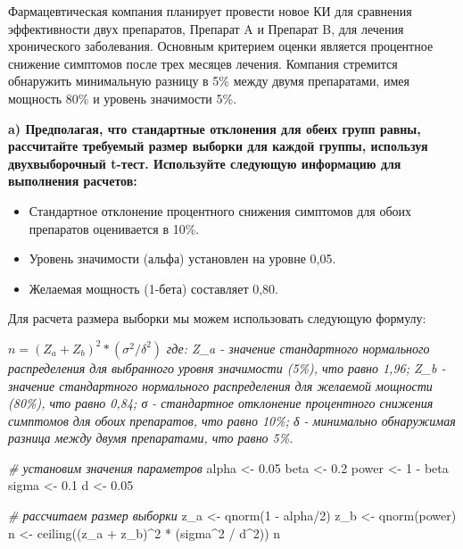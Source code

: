 \documentclass[
]{article}
\newenvironment{Shaded}{\begin{snugshade}}{\end{snugshade}}
\newcommand{\CommentTok}[1]{\textcolor[rgb]{0.56,0.35,0.01}{\textit{#1}}}
\newcommand{\DecValTok}[1]{\textcolor[rgb]{0.00,0.00,0.81}{#1}}
\newcommand{\FloatTok}[1]{\textcolor[rgb]{0.00,0.00,0.81}{#1}}
\newcommand{\FunctionTok}[1]{\textcolor[rgb]{0.00,0.00,0.00}{#1}}
\newcommand{\NormalTok}[1]{#1}
\newcommand{\OtherTok}[1]{\textcolor[rgb]{0.56,0.35,0.01}{#1}}
\newcommand{\SpecialCharTok}[1]{\textcolor[rgb]{0.00,0.00,0.00}{#1}}
\begin{document}
Фармацевтическая компания планирует провести новое КИ для сравнения
эффективности двух препаратов, Препарат A и Препарат B, для лечения
хронического заболевания. Основным критерием оценки является процентное
снижение симптомов после трех месяцев лечения. Компания стремится
обнаружить минимальную разницу в 5\% между двумя препаратами, имея
мощность 80\% и уровень значимости 5\%.

\textbf{a) Предполагая, что стандартные отклонения для обеих групп
равны, рассчитайте требуемый размер выборки для каждой группы, используя
двухвыборочный t-тест. Используйте следующую информацию для выполнения
расчетов:}

\begin{itemize}
\item
  Стандартное отклонение процентного снижения симптомов для обоих
  препаратов оценивается в 10\%.
\item
  Уровень значимости (альфа) установлен на уровне 0,05.
\item
  Желаемая мощность (1-бета) составляет 0,80.
\end{itemize}

Для расчета размера выборки мы можем использовать следующую формулу:

\(n = (Z_a + Z_b)^2 * (σ^2 / δ^2)\) \emph{где: Z\_a - значение
стандартного нормального распределения для выбранного уровня значимости
(5\%), что равно 1,96; Z\_b - значение стандартного нормального
распределения для желаемой мощности (80\%), что равно 0,84; σ -
стандартное отклонение процентного снижения симптомов для обоих
препаратов, что равно 10\%; δ - минимально обнаружимая разница между
двумя препаратами, что равно 5\%.}

\begin{Shaded}
\begin{Highlighting}[]
\CommentTok{\# установим значения параметров}
\NormalTok{alpha }\OtherTok{\textless{}{-}} \FloatTok{0.05}
\NormalTok{beta }\OtherTok{\textless{}{-}} \FloatTok{0.2}
\NormalTok{power }\OtherTok{\textless{}{-}} \DecValTok{1} \SpecialCharTok{{-}}\NormalTok{ beta}
\NormalTok{sigma }\OtherTok{\textless{}{-}} \FloatTok{0.1}
\NormalTok{d }\OtherTok{\textless{}{-}} \FloatTok{0.05}

\CommentTok{\# рассчитаем размер выборки}
\NormalTok{z\_a }\OtherTok{\textless{}{-}} \FunctionTok{qnorm}\NormalTok{(}\DecValTok{1} \SpecialCharTok{{-}}\NormalTok{ alpha}\SpecialCharTok{/}\DecValTok{2}\NormalTok{)}
\NormalTok{z\_b }\OtherTok{\textless{}{-}} \FunctionTok{qnorm}\NormalTok{(power)}
\NormalTok{n }\OtherTok{\textless{}{-}} \FunctionTok{ceiling}\NormalTok{((z\_a }\SpecialCharTok{+}\NormalTok{ z\_b)}\SpecialCharTok{\^{}}\DecValTok{2} \SpecialCharTok{*}\NormalTok{  (sigma}\SpecialCharTok{\^{}}\DecValTok{2} \SpecialCharTok{/}\NormalTok{ d}\SpecialCharTok{\^{}}\DecValTok{2}\NormalTok{))}
\NormalTok{n}
\end{Highlighting}
\end{Shaded}
\end{document}
